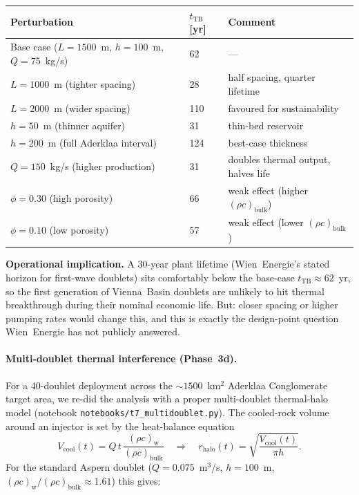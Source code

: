 \documentclass{article}
\begin{document}
\begin{center}
\begin{tabular}{lll}
\hline
\textbf{Perturbation} & $t_{\mathrm{TB}}$ [yr] & \textbf{Comment} \\
\hline
Base case ($L=1500$~m, $h=100$~m, $Q=75$~kg/s) & 62  & --- \\
$L=1000$~m (tighter spacing)                    & 28  & half spacing, quarter lifetime \\
$L=2000$~m (wider spacing)                      & 110 & favoured for sustainability \\
$h=50$~m (thinner aquifer)                      & 31  & thin-bed reservoir \\
$h=200$~m (full Aderklaa interval)              & 124 & best-case thickness \\
$Q=150$~kg/s (higher production)                & 31  & doubles thermal output, halves life \\
$\phi=0.30$ (high porosity)                     & 66  & weak effect (higher $(\rho c)_{\mathrm{bulk}}$) \\
$\phi=0.10$ (low porosity)                      & 57  & weak effect (lower $(\rho c)_{\mathrm{bulk}}$) \\
\hline
\end{tabular}
\end{center}

\textbf{Operational implication.} A 30-year plant lifetime
(Wien~Energie's stated horizon for first-wave doublets) sits
comfortably below the base-case $t_{\mathrm{TB}}\approx 62$~yr,
so the first generation of Vienna~Basin doublets are unlikely to
hit thermal breakthrough during their nominal economic life.
But: closer spacing or higher pumping rates would change this, and
this is exactly the design-point question Wien~Energie has not
publicly answered.

\paragraph{Multi-doublet thermal interference (Phase~3d).} For a
40-doublet deployment across the $\sim 1500$~km$^2$ Aderklaa
Conglomerate target area, we re-did the analysis with a proper
multi-doublet thermal-halo model (notebook
\texttt{notebooks/t7\_multidoublet.py}). The cooled-rock volume
around an injector is set by the heat-balance equation
\[
V_{\mathrm{cool}}(t) = Q\,t\,
\frac{(\rho c)_{\mathrm{w}}}{(\rho c)_{\mathrm{bulk}}}
\quad\Longrightarrow\quad
r_{\mathrm{halo}}(t) = \sqrt{\frac{V_{\mathrm{cool}}(t)}{\pi h}}.
\]
For the standard Aspern doublet
($Q = 0.075$~m$^3$/s, $h = 100$~m, $(\rho c)_{\mathrm{w}}/(\rho
c)_{\mathrm{bulk}} \approx 1.61$) this gives:
\end{document}
